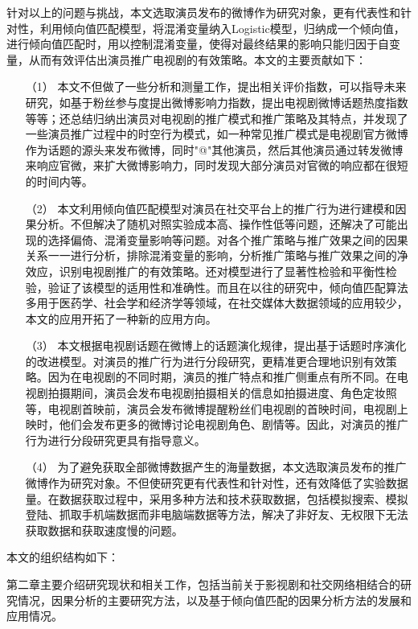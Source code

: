 针对以上的问题与挑战，本文选取演员发布的微博作为研究对象，更有代表性和针对性，利用倾向值匹配模型，将混淆变量纳入Logistic模型，归纳成一个倾向值，进行倾向值匹配时，用以控制混淆变量，使得对最终结果的影响只能归因于自变量，从而有效评估出演员推广电视剧的有效策略。本文的主要贡献如下：

\begin{itemize}

\item[（1）]本文不但做了一些分析和测量工作，提出相关评价指数，可以指导未来研究，如基于粉丝参与度提出微博影响力指数，提出电视剧微博话题热度指数等等；还总结归纳出演员对电视剧的推广模式和推广策略及其特点，并发现了一些演员推广过程中的时空行为模式，如一种常见推广模式是电视剧官方微博作为话题的源头来发布微博，同时"@"其他演员，然后其他演员通过转发微博来响应官微，来扩大微博影响力，同时发现大部分演员对官微的响应都在很短的时间内等。

\item[（2）]本文利用倾向值匹配模型对演员在社交平台上的推广行为进行建模和因果分析。不但解决了随机对照实验成本高、操作性低等问题，还解决了可能出现的选择偏倚、混淆变量影响等问题。对各个推广策略与推广效果之间的因果关系一一进行分析，排除混淆变量的影响，分析推广策略与推广效果之间的净效应，识别电视剧推广的有效策略。还对模型进行了显著性检验和平衡性检验，验证了该模型的适用性和准确性。而且在以往的研究中，倾向值匹配算法多用于医药学、社会学和经济学等领域，在社交媒体大数据领域的应用较少，本文的应用开拓了一种新的应用方向。

\item[（3）]本文根据电视剧话题在微博上的话题演化规律，提出基于话题时序演化的改进模型。对演员的推广行为进行分段研究，更精准更合理地识别有效策略。因为在电视剧的不同时期，演员的推广特点和推广侧重点有所不同。在电视剧拍摄期间，演员会发布电视剧拍摄相关的信息如拍摄进度、角色定妆照等，电视剧首映前，演员会发布微博提醒粉丝们电视剧的首映时间，电视剧上映时，他们会发布更多的微博讨论电视剧角色、剧情等。因此，对演员的推广行为进行分段研究更具有指导意义。

\item[（4）]为了避免获取全部微博数据产生的海量数据，本文选取演员发布的推广微博作为研究对象。不但使研究更有代表性和针对性，还有效降低了实验数据量。在数据获取过程中，采用多种方法和技术获取数据，包括模拟搜索、模拟登陆、抓取手机端数据而非电脑端数据等方法，解决了非好友、无权限下无法获取数据和获取速度慢的问题。

\end{itemize}

本文的组织结构如下：

第二章主要介绍研究现状和相关工作，包括当前关于影视剧和社交网络相结合的研究情况，因果分析的主要研究方法，以及基于倾向值匹配的因果分析方法的发展和应用情况。

